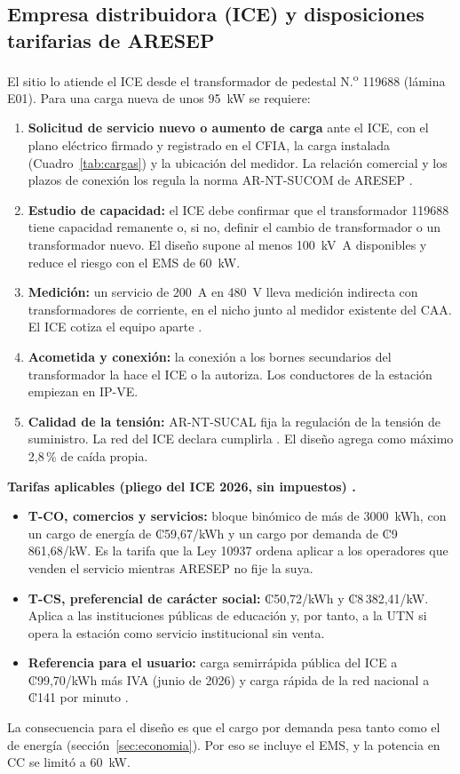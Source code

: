 \subsection{Empresa distribuidora (ICE) y disposiciones tarifarias de ARESEP}
\label{sec:distribuidora}
El sitio lo atiende el ICE desde el transformador de pedestal N.\textsuperscript{o} 119688 (lámina E01). Para una carga nueva de unos \SI{95}{\kilo\watt} se requiere:
\begin{enumerate}[label=(\alph*)]
\item \textbf{Solicitud de servicio nuevo o aumento de carga} ante el ICE, con el plano eléctrico firmado y registrado en el CFIA, la carga instalada (Cuadro~\ref{tab:cargas}) y la ubicación del medidor. La relación comercial y los plazos de conexión los regula la norma AR-NT-SUCOM de ARESEP \cite{aresepNorm}.
\item \textbf{Estudio de capacidad:} el ICE debe confirmar que el transformador 119688 tiene capacidad remanente o, si no, definir el cambio de transformador o un transformador nuevo. El diseño supone al menos \SI{100}{\kilo\volt\ampere} disponibles \supuesto{} y reduce el riesgo con el EMS de \SI{60}{\kilo\watt}.
\item \textbf{Medición:} un servicio de 200~A en 480~V lleva medición indirecta con transformadores de corriente, en el nicho junto al medidor existente del CAA. El ICE cotiza el equipo aparte \supuesto{}.
\item \textbf{Acometida y conexión:} la conexión a los bornes secundarios del transformador la hace el ICE o la autoriza. Los conductores de la estación empiezan en IP-VE.
\item \textbf{Calidad de la tensión:} AR-NT-SUCAL fija la regulación de la tensión de suministro. La red del ICE declara cumplirla \cite{delfinoAresep}. El diseño agrega como máximo 2,8\,\% de caída propia.
\end{enumerate}

\textbf{Tarifas aplicables (pliego del ICE 2026, sin impuestos) \cite{icePliego}.}
\begin{itemize}
\item \textbf{T-CO, comercios y servicios:} bloque binómico de más de 3000~kWh, con un cargo de energía de ₡59,67/kWh y un cargo por demanda de ₡9\,861,68/kW. Es la tarifa que la Ley 10937 ordena aplicar a los operadores que venden el servicio mientras ARESEP no fije la suya.
\item \textbf{T-CS, preferencial de carácter social:} ₡50,72/kWh y ₡8\,382,41/kW. Aplica a las instituciones públicas de educación y, por tanto, a la UTN si opera la estación como servicio institucional sin venta.
\item \textbf{Referencia para el usuario:} carga semirrápida pública del ICE a ₡99,70/kWh más IVA (junio de 2026) \cite{electrive2026} y carga rápida de la red nacional a ₡141 por minuto \cite{aresep2023}.
\end{itemize}
La consecuencia para el diseño es que el cargo por demanda pesa tanto como el de energía (sección~\ref{sec:economia}). Por eso se incluye el EMS, y la potencia en CC se limitó a \SI{60}{\kilo\watt}.

